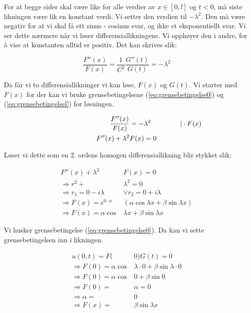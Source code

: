 For at begge sider skal være like for alle verdier av $x \in \left[ 0 , l \right]$ og $t < 0$, må siste 
likningen være lik en konstant verdi. Vi setter den verdien til $- \lambda^2$. Den må være negativ for 
at vi skal få ett sinus - cosinus svar, og ikke et eksponentiellt svar. Vi ser dette nærmere når vi løser
differensiallikningene. Vi opphøyer den i andre, for å vise at konstanten alltid er positiv.
Det kan skrives slik:

\begin{equation*}
	\frac{F''(x)}{F(x)} = \frac{1}{C^2} \frac{G''(t)}{G(t)} = - \lambda^2
\end{equation*}

Da får vi to differensiallikninger vi kan løse, $F(x)$ og $G(t)$. Vi starter med $F(x)$ for der
kan vi bruke grensebetingelsene (\ref{eq:grensebetingelse0}) og (\ref{eq:grensebetingelsel}) for 
løsningen.

\begin{align*}
	\hspace{20ex} \frac{F''(x)}{F(x)} &= - \lambda^2 \hspace{10ex} \vert \cdot F(x)\\
	F''(x) + \lambda^2&F(x) = 0
\end{align*}

Løser vi dette som en 2. ordens homogen differensiallikning blir stykket slik:

\begin{align*}
	F''(x) + \lambda^2&F(x) = 0 \\ 
	\Rightarrow r^2 + &\lambda^2 = 0 \\
	\Rightarrow r_1 = 0 - i \lambda &\vee r_2 = 0 + i \lambda \\
	\Rightarrow F(x) = e^{0 \cdot x} & \left( \alpha  \cos \lambda x + \beta \sin \lambda x \right) \\
	\Rightarrow F(x) = \alpha \cos& \lambda x + \beta \sin \lambda x 
\end{align*}

Vi husker grensebetingelse (\ref{eq:grensebetingelse0}). Da kan vi sette grensebetingelsen inn 
i likningen.

\begin{align*}
	u(0 , t) = F(&0)G(t) = 0\\
	\Rightarrow F(0) = \alpha \cos&\lambda \cdot 0 + \beta \sin \lambda \cdot 0 \\
	\Rightarrow F(0) = \alpha \cos&0 + \beta \sin 0 \\
	\Rightarrow F(0) = &\alpha = 0 \\
	\Rightarrow \alpha =& 0 \\
	\Rightarrow F(x) = &\beta \sin \lambda x
\end{align*}

